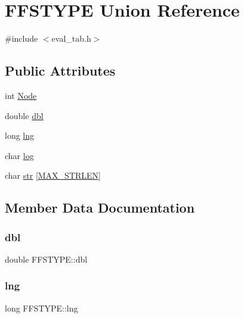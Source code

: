 \hypertarget{union_f_f_s_t_y_p_e}{}\section{F\+F\+S\+T\+Y\+PE Union Reference}
\label{union_f_f_s_t_y_p_e}


{\ttfamily \#include $<$eval\+\_\+tab.\+h$>$}

\subsection*{Public Attributes}
\begin{DoxyCompactItemize}
\item 
int \hyperlink{union_f_f_s_t_y_p_e_a533544a453ecac4b6e2eae93ee87379b}{Node}
\item 
double \hyperlink{union_f_f_s_t_y_p_e_a94c0c8a90df64f430699cd50c30881e3}{dbl}
\item 
long \hyperlink{union_f_f_s_t_y_p_e_a40d84766dd75f6c1fc6ffe119ec45dd9}{lng}
\item 
char \hyperlink{union_f_f_s_t_y_p_e_adac2b43ce6df7346a04a0891dfed10d6}{log}
\item 
char \hyperlink{union_f_f_s_t_y_p_e_a8c253ac04ed3f5801a03183359b82c92}{str} \mbox{[}\hyperlink{eval__defs_8h_ae381522e1d10c3730b356f1ac5d2dccb}{M\+A\+X\+\_\+\+S\+T\+R\+L\+EN}\mbox{]}
\end{DoxyCompactItemize}


\subsection{Member Data Documentation}
\mbox{\label{union_f_f_s_t_y_p_e_a94c0c8a90df64f430699cd50c30881e3}} 
\subsubsection{\texorpdfstring{dbl}{dbl}}
{\footnotesize\ttfamily double F\+F\+S\+T\+Y\+P\+E\+::dbl}

\mbox{\label{union_f_f_s_t_y_p_e_a40d84766dd75f6c1fc6ffe119ec45dd9}} 
\subsubsection{\texorpdfstring{lng}{lng}}
{\footnotesize\ttfamily long F\+F\+S\+T\+Y\+P\+E\+::lng}

